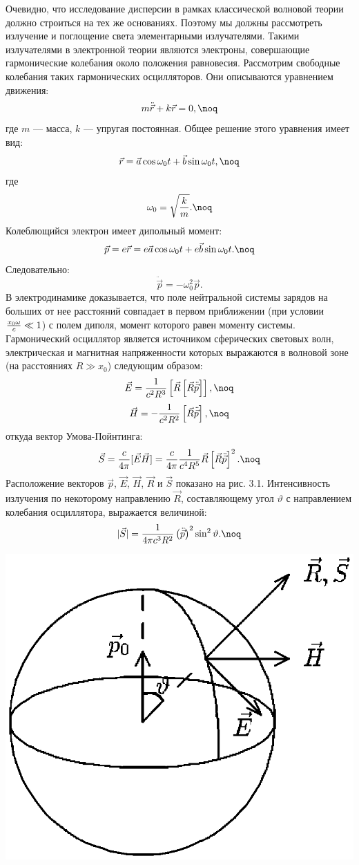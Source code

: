 Очевидно, что исследование дисперсии в рамках классической
волновой теории должно строиться на тех же основаниях. Поэтому мы
должны рассмотреть излучение и поглощение света элементарными
излучателями. Такими излучателями в электронной теории являются
электроны, совершающие гармонические колебания около положения
равновесия. Рассмотрим свободные колебания таких гармонических
осцилляторов. Они описываются уравнением движения:
$$m\ddot{\vec r}+k\vec r=0,\noq$$
где $m$ --- масса, $k$ --- упругая постоянная. Общее решение этого
уравнения имеет вид:
$$\vec r=\vec a\cos \omega_0t+\vec b\sin \omega_0t,\noq$$
где $$\omega_0=\sqrt{{k\over m}}.\noq$$ Колеблющийся электрон
имеет дипольный момент:
$$\vec p=e\vec r=e\vec a\cos \omega_0t+e\vec b\sin \omega_0t.\noq$$
Следовательно:
$$\ddot{\vec p}=-\omega_{0}^2\vec p.$$
В электродинамике доказывается, что поле нейтральной системы
зарядов на больших от нее расстояний совпадает в первом
приближении (при условии ${x_0\omega\over c}\ll 1$) с полем
диполя, момент которого равен моменту системы. Гармонический
осциллятор является источником сферических световых волн,
электрическая и магнитная напряженности которых выражаются в
волновой зоне (на расстояниях $R\gg x_0$) следующим образом:
$$\vec E={1\over c^2R^3}\left[\vec R\left[\vec R\ddot{\vec
p}\right]\right],\noq$$
$$\vec H=-{1\over c^2R^2}\left[\vec R\ddot{\vec
p\mathstrut}\right],\noq$$ откуда вектор Умова-Пойнтинга:
$$\vec S={c\over4\pi}[\vec E\vec H]={c\over4\pi}{1\over
c^{4}R^5}\vec R\left[\vec R\ddot{\vec p}\right]^2.\noq$$
Расположение векторов $\vec p$, $\vec E$, $\vec H$, $\vec R$ и
$\vec S$ показано на рис. 3.1. Интенсивность излучения по
некоторому направлению $\vec R$, составляющему угол $\vartheta$ с
направлением колебания осциллятора, выражается величиной:
$$|\vec S|={1\over 4\pi c^3R^2}\left(\ddot{\vec
p}\right)^2\sin^2\vartheta.\noq$$

\vskip 3mm
\centerline{\hbox{\includegraphics[scale=0.7]{Ris/ris_eps/ris3_01.eps}}}

